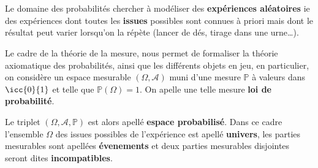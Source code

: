 \chapter*{} %
Le domaine des probabilités chercher à modéliser des \textbf{expériences aléatoires} ie des expériences dont toutes les \textbf{issues} possibles sont connues à priori mais dont le résultat peut varier lorsqu'on la répète (lancer de dés, tirage dans une urne\ldots).\<

Le cadre de la théorie de la mesure, nous permet de formaliser la théorie axiomatique des probabilités, ainsi que les différents objets en jeu, en particulier, on considère un espace mesurable \( ( \Omega, \mathcal{A}) \) muni d'une mesure \( \mathbb{P} \) à valeurs dans \( \icc{0}{1} \) et telle que \( \mathbb{P}( \Omega) = 1 \). On apelle une telle mesure \textbf{loi de probabilité}.\<

Le triplet \( ( \Omega, \mathcal{A}, \mathbb{P}) \) est alors apellé \textbf{espace probabilisé}. Dans ce cadre l'ensemble \( \Omega \) des issues possibles de l'expérience est apellé \textbf{univers}, les parties mesurables sont apellées \textbf{évenements} et deux parties mesurables disjointes seront dites \textbf{incompatibles}.

